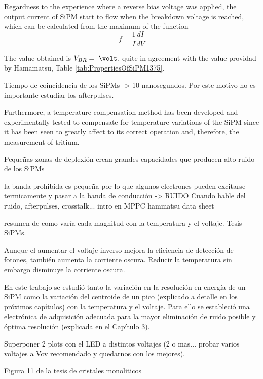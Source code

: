 Regardness to the experience where a reverse bias voltage was applied, the output current of SiPM start to flow when the breakdown voltage is reached, which can be calculated from the maximum of the function 
\begin{equation}
f=\frac{1}{I}\frac{dI}{dV}
\label{BreakDownVoltageFunction}
\end{equation}

The value obtained is $V_{BR}=~\volt$, quite in agreement with the value providad by Hamamatsu, Table \ref{tab:PropertiesOfSiPM1375}.






Tiempo de coincidencia de los SiPMs -> 10 nanosegundos. Por este motivo no es importante estudiar los afterpulses.


Furthermore, a temperature compensation method has been developed and experimentally tested to compensate for temperature variations of the SiPM since it has been seen to greatly affect to its correct operation and, therefore, the measurement of tritium.


Pequeñas zonas de deplexión crean grandes capacidades que producen alto ruido de los SiPMs

la banda prohibida es pequeña por lo que algunos electrones pueden excitarse termicamente y pasar a la banda de conducción -> RUIDO
Cuando hable del ruido, afterpulses, crosstalk... intro en MPPC hammatsu data sheet

resumen de como varía cada magnitud con la temperatura y el voltaje. Tesis SiPMs.

Aunque el aumentar el voltaje inverso mejora la eficiencia de detección de fotones, también aumenta la corriente oscura. Reducir la temperatura sin embargo disminuye la corriente oscura.

En este trabajo se estudió tanto la variación en la resolución en energía de un SiPM como la variación del centroide de un pico (explicado a detalle en los próximos capítulos) con la temperatura y el voltaje. Para ello se estableció una electrónica de adquisición adecuada para la mayor eliminación de ruido posible y óptima resolución (explicada en el Capítulo 3).


Superponer 2 plots con el LED a distintos voltajes (2 o mas... probar varios voltajes a Vov recomendado y quedarnos con los mejores).

Figura 11 de la tesis de cristales monoliticos
